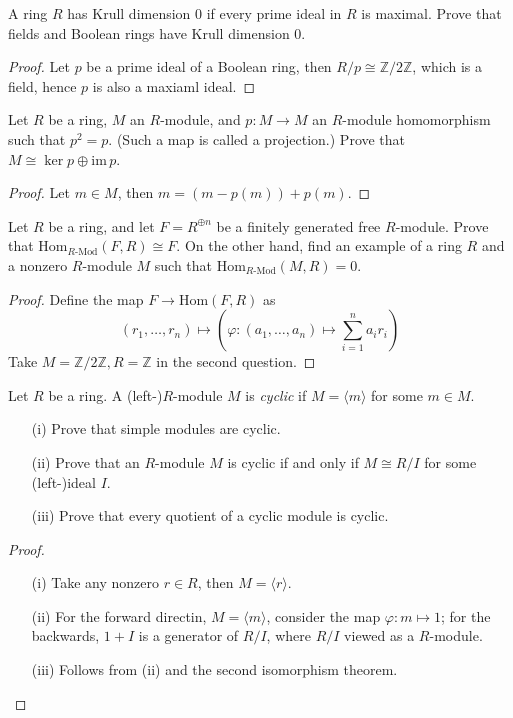 \documentclass[openany]{book}
\newcommand{\Z}{\mathbb{Z}}
\newcommand{\la}{\langle}
\newcommand{\ra}{\rangle}
\begin{document}
\begin{prob}[4.23]
    A ring \( R \) has Krull dimension 0 if every prime ideal in \( R \) is maximal. Prove that fields and Boolean rings have Krull dimension 0.
\end{prob}
\begin{proof}
    Let $p$ be a prime ideal of a Boolean ring, then $R/p\cong\Z/2\Z$, which is a field, hence $p$ is also a maxiaml ideal.
\end{proof}


\begin{prob}[6.3]
    Let \( R \) be a ring, \( M \) an \( R \)-module, and \( p : M \to M \) an \( R \)-module homomorphism such that \( p^2 = p \). (Such a map is called a projection.) Prove that \( M \cong \ker p \oplus \text{im}\, p \).
\end{prob}
\begin{proof}
    Let $m\in M$, then $m=(m-p(m))+p(m)$.
\end{proof}


\begin{prob}[6.6]
    Let \( R \) be a ring, and let \( F = R^{\oplus n} \) be a finitely generated free \( R \)-module. Prove that \(\text{Hom}_{R\text{-Mod}}(F, R) \cong F\). On the other hand, find an example of a ring \( R \) and a nonzero \( R \)-module \( M \) such that \(\text{Hom}_{R\text{-Mod}}(M, R) = 0\).
\end{prob}
\begin{proof}
    Define the map $F\to\text{Hom}(F,R)$ as
    \begin{equation*}
        (r_1,\dots, r_n)\mapsto \left(\varphi: (a_1,\dots, a_n)\mapsto \sum_{i=1}^na_ir_i\right)
    \end{equation*}
    Take $M=\Z/2\Z, R=\Z$ in the second question.
\end{proof}


\begin{prob}[6.16]
    Let \( R \) be a ring. A (left-)\( R \)-module \( M \) is \textit{cyclic} if \( M = \langle m \rangle \) for some \( m \in M \). 
    \begin{itemize}
        \item[(i)] Prove that simple modules are cyclic.
        \item[(ii)] Prove that an \( R \)-module \( M \) is cyclic if and only if \( M \cong R/I \) for some (left-)ideal \( I \).
        \item[(iii)] Prove that every quotient of a cyclic module is cyclic.
    \end{itemize}
\end{prob}
\begin{proof}
    \begin{itemize}
        \item[(i)] Take any nonzero $r\in R$, then $M=\la r\ra$.
        \item[(ii)] For the forward directin, $M=\la m\ra$, consider the map $\varphi: m\mapsto 1$; for the backwards, $1+I$ is a generator of $R/I$, where $R/I$ viewed as a $R$-module.
        \item[(iii)] Follows from (ii) and the second isomorphism theorem.
    \end{itemize}
\end{proof}
\end{document}
